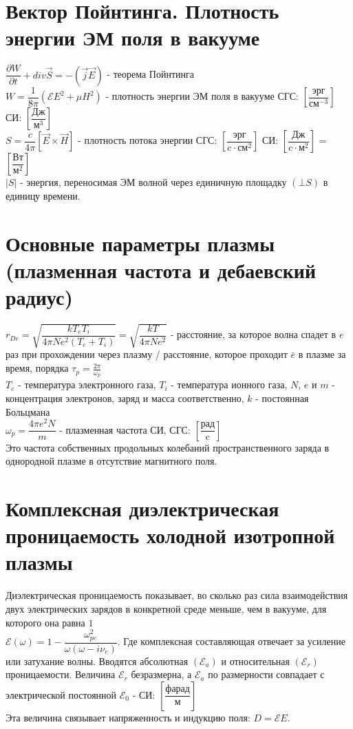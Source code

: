 \begin{multicols*}{2}
		\section{Вектор Пойнтинга. Плотность энергии ЭМ поля в вакууме}
		$\dfrac{\partial W}{\partial t} + div \vec{S} = - (\vec{j}  \vec{E})$ - теорема Пойнтинга\\
		$W = \dfrac{1}{8\pi} (\mathcal{E}E^2 + \mu H^2)$ - плотность энергии ЭМ поля в вакууме \quad СГС: $\left[\dfrac{\text{эрг}}{\text{см}^{-3}}\right]$ \quad СИ: $\left[\dfrac{\text{Дж}}{\text{м}^3}\right]$\\
		$S = \dfrac{c}{4\pi} \left[\vec{E}\times \vec{H}\right]$ - плотность потока энергии \quad СГС: $\left[\dfrac{\text{эрг}}{\text{c}\cdot\text{см}^2}\right]$ \quad СИ: $\left[\dfrac{\text{Дж}}{\text{c}\cdot \text{м}^2}\right]$ = $\left[\dfrac{\text{Вт}}{\text{м}^2}\right]$\\
		$\left\lvert S\right\rvert$ - энергия, переносимая ЭМ волной через единичную площадку $(\bot S)$ в единицу времени.

		\section{Основные параметры плазмы (плазменная частота и дебаевский радиус)}
		$r_{De} = \sqrt{\dfrac{k T_e T_i}{4\pi N e^2(T_e + T_i)}} = \sqrt{\dfrac{k T}{4\pi N e^2}}$ - расстояние, за которое волна спадет в $e$ раз при прохождении через плазму / расстояние, которое проходит $\bar{e}$ в плазме за время, порядка $\tau_p = \frac{2\pi}{\omega_p}$\\
		$T_e$ - температура электронного газа, $T_i$ - температура ионного газа, $N$, $e$ и $m$ - концентрация электронов, заряд и масса соответственно, $k$ - постоянная Больцмана\\
		$\omega_p = \dfrac{4\pi e^2 N}{m}$ - плазменная частота \quad СИ, СГС: $\left[\dfrac{\text{рад}}{\text{c}}\right]$\\
		Это частота собственных продольных колебаний пространственного заряда в однородной плазме в отсутствие магнитного поля.

		\section{Комплексная диэлектрическая проницаемость холодной изотропной плазмы}
		Диэлектрическая проницаемость показывает, во сколько раз сила взаимодействия двух электрических зарядов в конкретной среде меньше, чем в вакууме, для которого она равна $1$\\
		$\mathcal{E} (\omega) = 1 - \dfrac{\omega_{pe}^2}{\omega(\omega - i\nu_e)}$. Где комплексная составляющая отвечает за усиление или затухание волны.
		Вводятся абсолютная $(\mathcal{E}_a)$ и относительная $(\mathcal{E}_r)$ проницаемости. Величина $\mathcal{E} _{r}$ безразмерна, а ${\displaystyle \mathcal{E} _{a}}$ по размерности совпадает с электрической постоянной $\mathcal{E}_{0}$ - СИ: $\left[\dfrac{\text{фарад}}{\text{м}}\right]$\\
		Эта величина связывает напряженность и индукцию поля: $D = \mathcal{E} E $.


	\end{multicols*}

